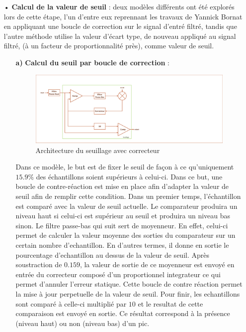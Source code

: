 \documentclass[a4paper,12pt]{article}
\begin{document}
\begin{itemize}
\item[•] \textbf{Calcul de la valeur de seuil} : deux modèles différents ont été explorés lors de cette étape, l'un d'entre eux reprennant les travaux de Yannick Bornat en appliquant une boucle de correction sur le signal d'entré filtré, tandis que l'autre méthode utilise la valeur d'écart type, de nouveau appliqué au signal filtré, (à un facteur de proportionnalité près), comme valeur de seuil.\\
\newpage
\begin{itemize}
\item[\textbf{a)}] \textbf{Calcul du seuil par boucle de correction} :
	\begin{figure}[H]
		\centering
		\includegraphics[scale=0.4, keepaspectratio]{chainCedric.pdf}
		\caption{Architecture du seuillage avec correcteur}
	\end{figure}
	Dans ce modèle, le but est de fixer le seuil de façon à ce qu'uniquement $15.9\%$ des échantillons soient supérieurs à celui-ci.
	Dans ce but, une boucle de contre-réaction est mise en place afin d'adapter la valeur de seuil afin de remplir cette condition.
	Dans un premier temps, l'échantillon est comparé avec la valeur de seuil actuelle. Le comparateur produira un niveau haut si celui-ci est supérieur au seuil et produira un niveau bas sinon. Le filtre passe-bas qui suit sert de moyenneur.
	En effet, celui-ci permet de calculer la valeur moyenne des sorties du comparateur sur un certain nombre d'echantillon.
	En d'autres termes, il donne en sortie le pourcentage d'echantillon au dessus de la valeur de seuil. Après soustraction de $0.159$, la valeur de sortie de ce moyenneur est envoyé en entrée du correcteur composé d'un proportionnel integrateur ce qui permet d'annuler l'erreur statique.
	Cette boucle de contre réaction permet la mise à jour perpetuelle de la valeur de seuil. Pour finir, les echantillons sont comparé à celle-ci multiplié par $10$ et le resultat de cette comparaison est envoyé en sortie. Ce résultat correspond à la présence (niveau haut) ou non (niveau bas) d'un pic.

\end{itemize}
\end{itemize}
\end{document}
